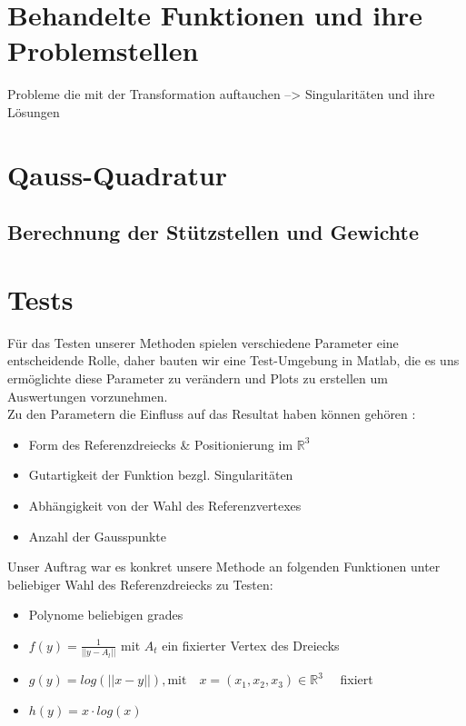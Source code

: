 \documentclass[12pt]{article}
\newcommand{\R}{\mathbb{R}}
\begin{document}
\newpage

\section{Behandelte Funktionen und ihre Problemstellen}


Probleme die mit der Transformation auftauchen --> Singularitäten und ihre Lösungen

\newpage

\section{Qauss-Quadratur}
\subsection{Berechnung der Stützstellen und Gewichte}

\newpage

\section{Tests}

Für das Testen unserer Methoden spielen verschiedene Parameter eine entscheidende Rolle, daher bauten wir eine Test-Umgebung in Matlab, die es uns ermöglichte diese Parameter zu verändern und Plots zu erstellen um Auswertungen vorzunehmen.
\\
Zu den Parametern die Einfluss auf das Resultat haben können gehören :

\begin{itemize}
	\item Form des Referenzdreiecks \& Positionierung im $\R^3$
	\item Gutartigkeit der Funktion bezgl. Singularitäten
	\item Abhängigkeit von der Wahl des Referenzvertexes
	\item Anzahl der Gausspunkte
\end{itemize}

Unser Auftrag war es konkret unsere Methode an folgenden Funktionen unter beliebiger Wahl des Referenzdreiecks zu Testen:




\begin{itemize}
	\item Polynome beliebigen grades
	\item $f(y) = \frac{1}{||y - A_l||} $ mit $A_t$ ein fixierter Vertex des Dreiecks
	\item $g(y) = log(||x - y||)  , \text{mit} \quad x = (x_1,x_2,x_3) \in \R^3\quad$ fixiert 
	\item $h(y) =x\cdot log(x) $
\end{itemize}
\end{document}
